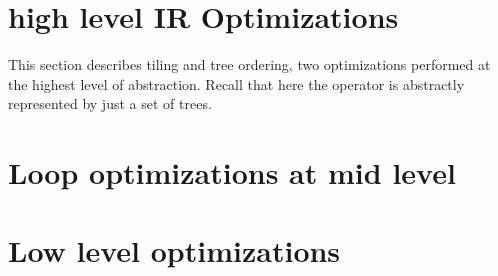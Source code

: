 \section{high level IR Optimizations}
This section describes tiling and tree ordering, two optimizations performed at the highest level of abstraction. Recall that here the  operator is abstractly represented by just a set of trees. 





\section{Loop optimizations at mid level}



\section{Low level optimizations}



